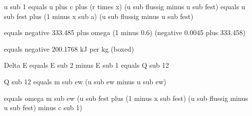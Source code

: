 u sub 1 equals u plus c plus (r times x) (u sub flussig minus u sub fest) equals u sub fest plus (1 minus x sub a) (u sub flussig minus u sub fest)

equals negative 333.485 plus omega (1 minus 0.6) (negative 0.0045 plus 333.458)

equals negative 200.1768 kJ per kg (boxed)

Delta E equals E sub 2 minus E sub 1 equals Q sub 12

Q sub 12 equals m sub ew (u sub ew minus u sub ew)

equals omega m sub ew (u sub fest plus (1 minus x sub fest) (u sub flussig minus u sub fest) minus c sub 1)